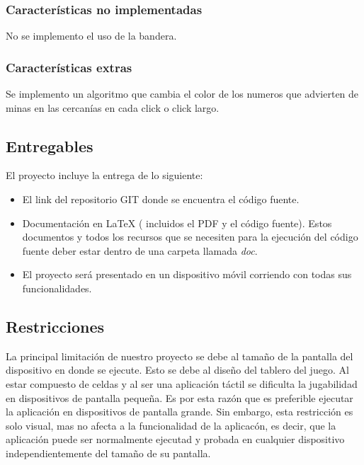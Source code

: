 \documentclass[11pt]{article} %
\begin{document}
\subsubsection{\textbf{Caracter\' isticas no implementadas}}

No se implemento el uso de la bandera.

\subsubsection{\textbf{Caracter\' isticas extras}}

Se implemento un algoritmo que cambia el color de los numeros que advierten de minas en las cercan\'ias en cada click o click largo.

\subsection{\textbf{Entregables}}
El proyecto incluye la entrega de lo siguiente:

\begin{itemize}
\item El link del repositorio GIT donde se encuentra el c\'odigo fuente.
\item Documentación en LaTeX ( incluidos el PDF y el c\'odigo fuente). Estos documentos y todos los recursos que se necesiten para la ejecuci\'on del c\'odigo fuente deber estar dentro de una carpeta llamada \textsl{doc}.
\item  El proyecto ser\'a presentado en un dispositivo m\'ovil corriendo con todas sus funcionalidades.
\end{itemize}

\subsection{\textbf{Restricciones}}
La principal limitaci\'on de nuestro proyecto se debe al tama\~no de la pantalla del dispositivo en donde se ejecute.
Esto se debe al dise\~no del tablero del juego. Al estar compuesto de celdas y al ser una aplicaci\'on t\'actil se dificulta la jugabilidad en dispositivos de pantalla peque\~na.
Es por esta raz\'on que es preferible ejecutar la aplicaci\'on en dispositivos de pantalla grande. Sin embargo, esta restricci\'on es solo visual, mas no afecta a la funcionalidad de la aplicac\'on, es decir, que la aplicaci\'on puede ser normalmente ejecutad y probada en cualquier dispositivo independientemente del tama\~no de su pantalla.

\newpage
\thispagestyle{empty}
\end{document}
